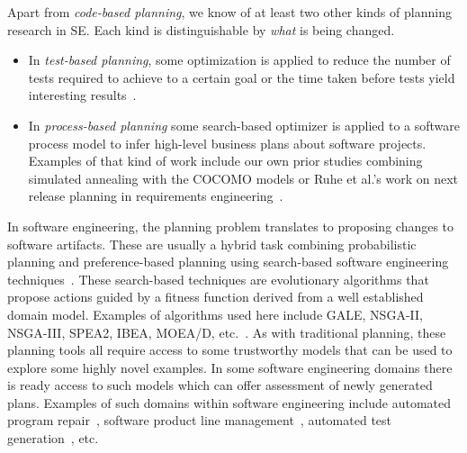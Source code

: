 \documentclass[10pt, journal, compsoc]{IEEEtran}
\newcommand{\bi}{\begin{itemize}} %
\newcommand{\ei}{\end{itemize}}
\begin{document}
Apart from {\em code-based planning}, we know of at least two other kinds of planning research in SE. Each kind is distinguishable by {\em what} is being changed.
\bi
\item
In {\em test-based planning}, some optimization is applied to reduce the number of tests required to achieve to a certain goal or the time taken before tests yield interesting results~\cite{tallam2006concept, yoo2012regression, blue2013interaction}.
\item
In {\em process-based planning} some search-based optimizer is applied to a software process model to infer high-level business plans about software projects. Examples of that kind of work include our own prior studies combining simulated annealing with the COCOMO models or Ruhe et al.'s work on next release planning in requirements engineering~\cite{ruhe2003quantitative, ruhe2010product}. 
\ei
In software engineering, the planning problem translates to proposing changes to software artifacts. These are usually a hybrid task combining probabilistic planning and preference-based planning using search-based software engineering techniques~\cite{Harman2009, Harman2011}. These search-based techniques are evolutionary algorithms that propose actions guided by a fitness function derived from a well established domain model. Examples of algorithms used here include GALE, NSGA-II, NSGA-III, SPEA2, IBEA, MOEA/D, etc.~\cite{krall2015gale, deb00a, zit02, zit04, deb14, Cui2005a, zhang07:TEC}. 
As with traditional planning, these planning tools all require access to some trustworthy models that can be used to explore some highly novel examples. In some software engineering domains there is ready access to such models which can offer assessment of newly generated plans. Examples of such domains within software engineering include automated program repair~\cite{Weimer2009, Goues12, LeGoues2015}, software product line management~\cite{sayyad13, metzger14, henard15}, automated test generation~\cite{andrews07, andrews10}, etc. 
\end{document}
